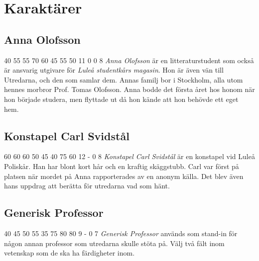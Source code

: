 \section{Karaktärer}
\subsection{Anna Olofsson}
\label{kar:AnnaOlofsson}
\character
{40}	%
{55}	%
{55}	%
{70}	%
{60}	%
{45}	%
{55}	%
{50}	%
{11}	%
{0}		%
{0}		%
{8}		%
%
{
}
%
{
\textit{Anna Olofsson} är en litteraturstudent som också är ansvarig utgivare för \textit{Luleå studentkårs magasin}. Hon är även vän till Utredarna, och den som samlar dem. Annas familj bor i Stockholm, alla utom hennes morbror Prof. Tomas Olofsson. Anna bodde det första året hos honom när hon började studera, men flyttade ut då hon kände att hon behövde ett eget hem.
}

\subsection{Konstapel Carl Svidstål}
\label{kar:KonstapelCarlSvidstal}
\character
{60}	%
{60}	%
{60}	%
{50}	%
{45}	%
{40}	%
{75}	%
{60}	%
{12}	%
{-}		%
{0}		%
{8}		%
%
{
}
%
{
\textit{Konstapel Carl Svidstål} är en konstapel vid Luleå Poliskår. Han har blont kort hår och en kraftig skäggstubb. Carl  var först på platsen när mordet på Anna rapporterades av en anonym källa. Det blev även hans uppdrag att berätta för utredarna vad som hänt.
}
%
\subsection{Generisk Professor}
\label{kar:GeneriskProfessor}
\character
{40}	%
{45}	%
{50}	%
{55}	%
{35}	%
{75}	%
{80}	%
{80}	%
{9}		%
{-}		%
{0}		%
{7}		%
%
{
}
%
{
\textit{Generisk Professor} används som stand-in för någon annan professor som utredarna skulle stöta på. Välj två fält inom vetenskap som de ska ha färdigheter inom.
}
%
